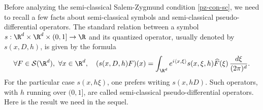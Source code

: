 Before analyzing the semi-classical Salem-Zygmund condition \eqref{pz-con-sc}, we need to recall a few facts about semi-classical symbols and semi-classical pseudo-differential operators.
The standard relation between a symbol $s:\R^d\times \R^d\times (0,1]\to \R$ and its quantized operator, usually denoted by $s(x,D,h)$, is given by the formula
\begin{equation}\label{defi-opd}
\forall F\in \mathcal{S}(\R^d),\ \forall x\in \R^d, \quad (s(x,D,h)F)(x)=\int_{\R^d}e^{i\langle x,\xi\rangle}
s(x,\xi,h) \widehat{F}(\xi)\, \frac{d\xi}{(2\pi)^d}.
\end{equation}
For the particular case $s(x,h\xi)$, one prefers writing $s(x,hD)$.
Such operators, with $h$ running over $(0,1]$, are called semi-classical pseudo-differential operators. Here is the result we need in the sequel.

